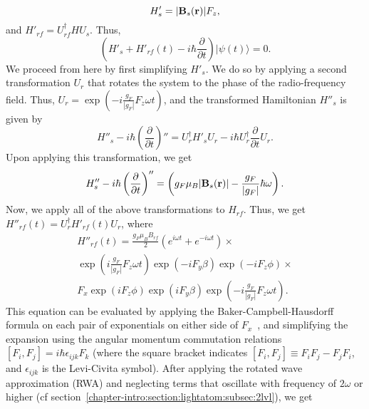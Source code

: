 \begin{equation}
H'_s = |{\bf B}_s({\bf r})|F_z,
\label{eq:hstrans:chapter-intro}
\end{equation}
and $H'_{rf}=U^\dagger_{rf} H U_s$. Thus, 
\begin{equation}
\left( H'_s + H'_{rf}(t) - i\hbar \frac{\partial}{\partial t} \right) |\psi(t)\rangle = 0.
\label{maghamiltdyntrans:split:chapter-intro}
\end{equation}
We proceed from here by first simplifying $H'_s$. We do so by applying a second transformation $U_r$ that rotates the system to the phase of the radio-frequency field. Thus, $U_r = \exp{\left(-i\frac{g_F}{|g_F|} F_z \omega t \right)}$, and the transformed Hamiltonian $H''_s$ is given by
\begin{equation}
H''_s - i\hbar \left( \frac{\partial}{\partial t} \right)'' =U^\dagger_r H'_s U_r - i\hbar U^\dagger_r \frac{\partial}{\partial t} U_r.
\end{equation}
Upon applying this transformation, we get
\begin{equation}
H''_s - i\hbar \left( \frac{\partial}{\partial t} \right)'' = \left( g_F  \mu_B |{\bf B}_s({\bf r})| -\frac{g_F}{|g_F|} \hbar \omega   \right).
\label{eq:hstransfinal:chapter-intro}
\end{equation}
Now, we apply all of the above transformations to $H_{rf}$. Thus, we get $H''_{rf}(t) = U^\dagger_r H'_{rf}(t)U_r$, where
\begin{multline}
H''_{rf}(t) =   \frac{g_F \mu_B B_{rf}}{2}\left( e^{i\omega t}+ e^{-i\omega t} \right) \times   \\
\exp{\left(i\frac{g_F}{|g_F|} F_z \omega t \right)} \exp{\left(- iF_y\beta\right)}  \exp{\left(- iF_z \phi \right)} \times \\
   F_x   \exp{\left( iF_z \phi \right)}\exp{\left( iF_y\beta\right)}  \exp{\left(-i\frac{g_F}{|g_F|} F_z \omega t \right)}.
\end{multline}
This equation can be evaluated by applying the Baker-Campbell-Hausdorff formula on each pair of exponentials on either side of $F_x$~\cite{sakurai}, and simplifying the expansion using the angular momentum commutation relations $\left[ F_i, F_j \right] = i\hbar \epsilon_{ijk} F_k$ (where the square bracket indicates $\left[ F_i, F_j \right] \equiv F_iF_j-F_jF_i$, and $\epsilon_{ijk}$ is the Levi-Civita symbol). After applying the rotated wave approximation (RWA) and neglecting terms that oscillate with frequency of $2\omega$ or higher (cf section~\ref{chapter-intro:section:lightatom:subsec:2lvl}), we get 

